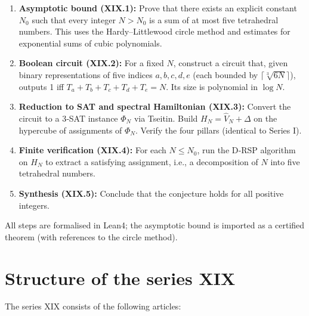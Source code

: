 \documentclass[11pt,a4paper]{article}
\begin{document}
\begin{enumerate}
\item \textbf{Asymptotic bound (XIX.1):} Prove that there exists an explicit constant \(N_0\) such that every integer \(N > N_0\) is a sum of at most five tetrahedral numbers. This uses the Hardy–Littlewood circle method and estimates for exponential sums of cubic polynomials.
\item \textbf{Boolean circuit (XIX.2):} For a fixed \(N\), construct a circuit that, given binary representations of five indices \(a,b,c,d,e\) (each bounded by \(\lceil \sqrt[3]{6N}\rceil\)), outputs 1 iff \(T_a+T_b+T_c+T_d+T_e=N\). Its size is polynomial in \(\log N\).
\item \textbf{Reduction to SAT and spectral Hamiltonian (XIX.3):} Convert the circuit to a 3‑SAT instance \(\Phi_N\) via Tseitin. Build \(H_N = \hat{V}_N + \Delta\) on the hypercube of assignments of \(\Phi_N\). Verify the four pillars (identical to Series I).
\item \textbf{Finite verification (XIX.4):} For each \(N\le N_0\), run the D‑RSP algorithm on \(H_N\) to extract a satisfying assignment, i.e., a decomposition of \(N\) into five tetrahedral numbers.
\item \textbf{Synthesis (XIX.5):} Conclude that the conjecture holds for all positive integers.
\end{enumerate}

All steps are formalised in Lean4; the asymptotic bound is imported as a certified theorem (with references to the circle method).

\section{Structure of the series XIX}

The series XIX consists of the following articles:
\end{document}
